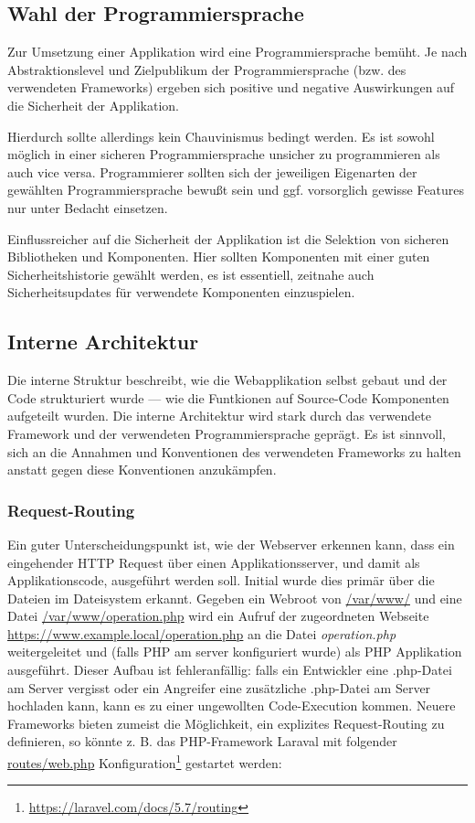 \subsection{Wahl der Programmiersprache}

Zur Umsetzung einer Applikation wird eine Programmiersprache bemüht. Je nach Abstraktionslevel und Zielpublikum der Programmiersprache (bzw. des verwendeten Frameworks) ergeben sich positive und negative Auswirkungen auf die Sicherheit der Applikation.

Hierdurch sollte allerdings kein Chauvinismus bedingt werden. Es ist sowohl möglich in einer sicheren Programmiersprache unsicher zu programmieren als auch vice versa. Programmierer sollten sich der jeweiligen Eigenarten der gewählten Programmiersprache bewußt sein und ggf. vorsorglich gewisse Features nur unter Bedacht einsetzen.

Einflussreicher auf die Sicherheit der Applikation ist die Selektion von sicheren Bibliotheken und Komponenten. Hier sollten Komponenten mit einer guten Sicherheitshistorie gewählt werden, es ist essentiell, zeitnahe auch Sicherheitsupdates für verwendete Komponenten einzuspielen.

\subsection{Interne Architektur}

Die interne Struktur beschreibt, wie die Webapplikation selbst gebaut und der Code strukturiert wurde --- wie die Funtkionen auf Source-Code Komponenten aufgeteilt wurden. Die interne Architektur wird stark durch das verwendete Framework und der verwendeten Programmiersprache geprägt. Es ist sinnvoll, sich an die Annahmen und Konventionen des verwendeten Frameworks zu halten anstatt gegen diese Konventionen anzukämpfen.

\subsubsection{Request-Routing}

Ein guter Unterscheidungspunkt ist, wie der Webserver erkennen kann, dass ein eingehender HTTP Request über einen Applikationsserver, und damit als Applikationscode, ausgeführt werden soll. Initial wurde dies primär über die Dateien im Dateisystem erkannt. Gegeben ein Webroot von \url{/var/www/} und eine Datei \url{/var/www/operation.php} wird ein Aufruf der zugeordneten Webseite \url{https://www.example.local/operation.php} an die Datei \textit{operation.php} weitergeleitet und (falls PHP am server konfiguriert wurde) als PHP Applikation ausgeführt. Dieser Aufbau ist fehleranfällig: falls ein Entwickler eine .php-Datei am Server vergisst oder ein Angreifer eine zusätzliche .php-Datei am Server hochladen kann, kann es zu einer ungewollten Code-Execution kommen. Neuere Frameworks bieten zumeist die Möglichkeit, ein explizites Request-Routing zu definieren, so könnte z. B. das PHP-Framework Laraval mit folgender \url{routes/web.php} Konfiguration\footnote{\url{https://laravel.com/docs/5.7/routing}} gestartet werden:

